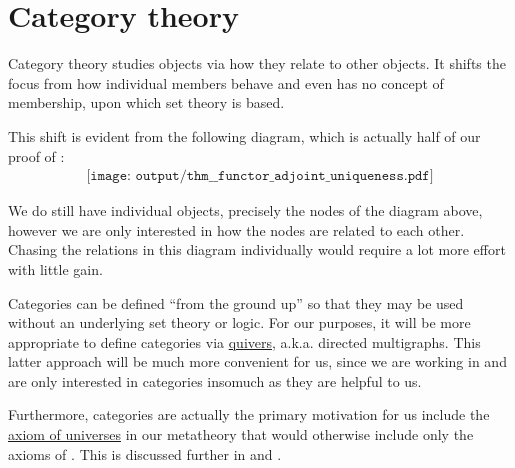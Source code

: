 \section{Category theory}\label{sec:category_theory}

Category theory studies objects via how they relate to other objects. It shifts the focus from how individual members behave and even has no concept of membership, upon which set theory is based.

This shift is evident from the following diagram, which is actually half of our proof of :
\begin{equation*}
  \begin{aligned}
    \texttt{[image: output/thm\_\_functor\_adjoint\_uniqueness.pdf]}
  \end{aligned}
\end{equation*}

We do still have individual objects, precisely the nodes of the diagram above, however we are only interested in how the nodes are related to each other. Chasing the relations in this diagram individually would require a lot more effort with little gain.

Categories can be defined \enquote{from the ground up} so that they may be used without an underlying set theory or logic. For our purposes, it will be more appropriate to define categories via \hyperref[def:quiver]{quivers}, a.k.a. directed multigraphs. This latter approach will be much more convenient for us, since we are working in \hyperref[def:axiom_of_universes]{} and are only interested in categories insomuch as they are helpful to us.

Furthermore, categories are actually the primary motivation for us include the \hyperref[def:axiom_of_universes]{axiom of universes} in our metatheory that would otherwise include only the axioms of \hyperref[def:zfc]{}. This is discussed further in  and .
